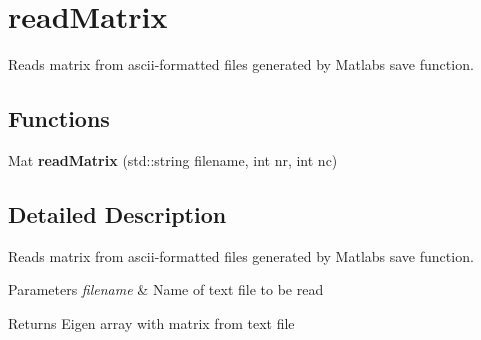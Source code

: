 \hypertarget{group__readMatrix}{}\section{read\+Matrix}
\label{group__readMatrix}


Reads matrix from ascii-\/formatted files generated by Matlab\textquotesingle{}s \textquotesingle{}save\textquotesingle{} function.  


\subsection*{Functions}
\begin{DoxyCompactItemize}
\item 
\mbox{\label{group__readMatrix_gab4929a29168c19ae6815ddf6a062a407}} 
Mat {\bfseries read\+Matrix} (std\+::string filename, int nr, int nc)
\end{DoxyCompactItemize}


\subsection{Detailed Description}
Reads matrix from ascii-\/formatted files generated by Matlab\textquotesingle{}s \textquotesingle{}save\textquotesingle{} function. 


\begin{DoxyParams}{Parameters}
{\em filename} & Name of text file to be read \\
\hline
\end{DoxyParams}
\begin{DoxyReturn}{Returns}
Eigen array with matrix from text file 
\end{DoxyReturn}
